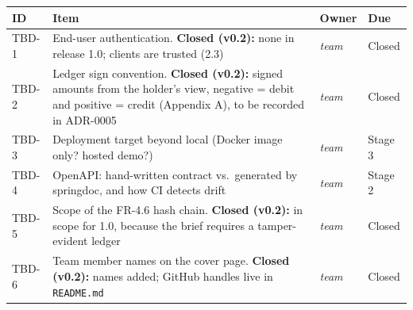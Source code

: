 \documentclass[11pt,a4paper]{article}
\newcounter{none} %
\begin{document}
{\def\LTcaptype{none} %
\begin{longtable}[]{@{}
  >{\raggedright\arraybackslash}p{}
  >{\raggedright\arraybackslash}p{}
  >{\raggedright\arraybackslash}p{}
  >{\raggedright\arraybackslash}p{}@{}}
\toprule\noalign{}
\begin{minipage}[b]{\linewidth}\raggedright
ID
\end{minipage} & \begin{minipage}[b]{\linewidth}\raggedright
Item
\end{minipage} & \begin{minipage}[b]{\linewidth}\raggedright
Owner
\end{minipage} & \begin{minipage}[b]{\linewidth}\raggedright
Due
\end{minipage} \\
\midrule\noalign{}
\endhead
\bottomrule\noalign{}
\endlastfoot
TBD-1 & End-user authentication. \textbf{Closed (v0.2):} none in release 1.0; clients are trusted (2.3) & \emph{team} & Closed \\
TBD-2 & Ledger sign convention. \textbf{Closed (v0.2):} signed amounts from the holder's view, negative = debit and positive = credit (Appendix A), to be recorded in ADR-0005 & \emph{team} & Closed \\
TBD-3 & Deployment target beyond local (Docker image only? hosted demo?) & \emph{team} & Stage 3 \\
TBD-4 & OpenAPI: hand-written contract vs.~generated by springdoc, and how CI detects drift & \emph{team} & Stage 2 \\
TBD-5 & Scope of the FR-4.6 hash chain. \textbf{Closed (v0.2):} in scope for 1.0, because the brief requires a tamper-evident ledger & \emph{team} & Closed \\
TBD-6 & Team member names on the cover page. \textbf{Closed (v0.2):} names added; GitHub handles live in \texttt{README.md} & \emph{team} & Closed \\
\end{longtable}
}
\end{document}
